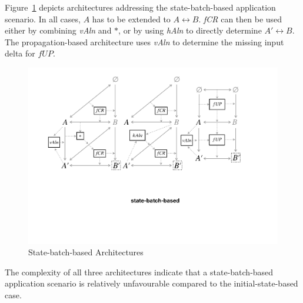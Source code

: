 Figure~\ref{fig:stateBatchBased} depicts architectures addressing the state-batch-based application scenario.
In all cases, $A$ has to be extended to $A \leftrightarrow B$.
\emph{fCR} can then be used either by combining \emph{vAln} and $\ast$, or by using \emph{hAln} to directly determine $A' \leftrightarrow B$.
The propagation-based architecture uses \emph{vAln} to determine the missing input delta for $\mathit{fUP}$.
%
\begin{figure}[tb!]
	\centering
	\includegraphics[width=\columnwidth]{diagrams/foundations/state-batch-based}
	\caption{State-batch-based Architectures}
	\label{fig:stateBatchBased}
\end{figure}
%
The complexity of all three architectures indicate that a state-batch-based application scenario is relatively unfavourable compared to the initial-state-based case.

